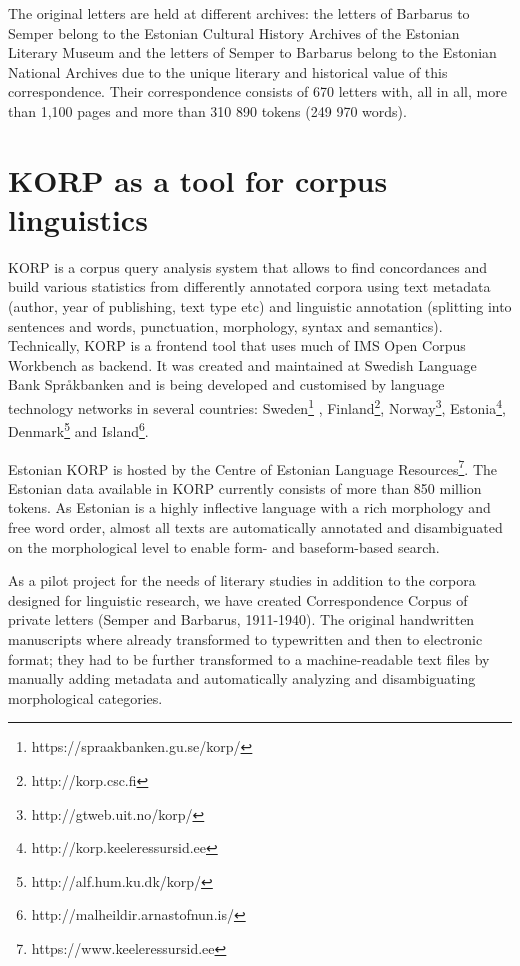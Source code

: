 \documentclass[runningheads]{llncs}
\begin{document}
The original letters are held at different archives: the letters of Barbarus to Semper belong to the Estonian Cultural History Archives of the Estonian Literary Museum and the letters of Semper to Barbarus belong to the Estonian National Archives due to the unique literary and historical value of this correspondence. Their correspondence consists of 670 letters with, all in all, more than 1,100 pages and more than 310 890 tokens (249 970 words). 


\section{KORP as a tool for corpus linguistics}

KORP is a corpus query analysis system that allows to find concordances and build various statistics from differently annotated corpora using text metadata (author, year of publishing, text type etc) and linguistic annotation (splitting into sentences and words, punctuation, morphology, syntax and semantics). Technically, KORP is a frontend tool that uses much of IMS Open Corpus Workbench as backend. It was created and maintained at Swedish Language Bank Spr{\aa}kbanken \cite{BORIN12.248} and is being developed and customised by language technology networks in several countries: Sweden\footnote{ https://spraakbanken.gu.se/korp/}
, Finland\footnote{http://korp.csc.fi}, Norway\footnote{http://gtweb.uit.no/korp/}, Estonia\footnote{http://korp.keeleressursid.ee}, Denmark\footnote{http://alf.hum.ku.dk/korp/} and Island\footnote{http://malheildir.arnastofnun.is/}. 

Estonian KORP is hosted by the Centre of Estonian Language Resources\footnote{https://www.keeleressursid.ee}. The Estonian data available in KORP currently consists of more than 850 million tokens. As Estonian is a highly inflective language with a rich morphology and free word order, almost all texts are automatically annotated and disambiguated on the morphological level to enable form- and baseform-based search.


As a pilot project for the needs of literary studies in addition to the corpora designed for linguistic research, we have created Correspondence Corpus of private letters (Semper and Barbarus, 1911-1940). The original handwritten manuscripts where already transformed to typewritten and then to electronic format; they had to be further transformed to a machine-readable text files by manually adding metadata and automatically analyzing and disambiguating morphological categories. 
\end{document}
